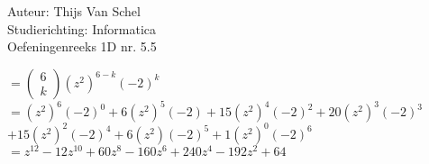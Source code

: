 \documentclass[a4paper]{article}
\begin{document}
  
\noindent \large Auteur: Thijs Van Schel \\
\noindent \large Studierichting: Informatica\\
\noindent \large Oefeningenreeks 1D nr. 5.5\\

\medskip

\normalsize
$=\left(
\begin{array}{c}
6 \\
k
\end{array}
\right)$$(z^2)^{6-k}(-2)^k$ \\

$=(z^2)^6(-2)^0 + 6(z^2)^5(-2) + 15(z^2)^4(-2)^2 + 20(z^2)^3(-2)^3$ \\

$+15(z^2)^2(-2)^4 + 6(z^2)(-2)^5 + 1(z^2)^0(-2)^6$ \\

$= z^{12} - 12z^{10} + 60z^8 - 160z^6 + 240z^4 - 192z^2 + 64$

\begin{thebibliography}{999}
\end{thebibliography}
\end{document}
